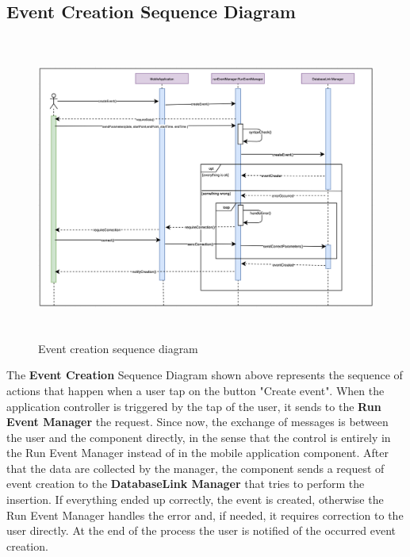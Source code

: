 \documentclass[DD.tex]{subfiles}
\begin{document}
\subsection{Event Creation Sequence Diagram}
\begin{figure}[h!]
\centering
\includegraphics[height=10.00cm,keepaspectratio]{Figures/EventCreation}
\caption{Event creation sequence diagram}
\end{figure}

The \textbf{Event Creation} Sequence Diagram shown above represents the sequence of actions that happen when a user tap on the button "Create event".
When the application controller is triggered by the tap of the user, it sends to the \textbf{Run Event Manager} the request.
Since now, the exchange of messages is between the user and the component directly, in the sense that the control is entirely in the Run Event Manager instead of in the mobile application component.
After that the data are collected by the manager, the component sends a request of event creation to the \textbf{DatabaseLink Manager} that tries to perform the insertion. \newline
If everything ended up correctly, the event is created, otherwise the Run Event Manager handles the error and, if needed, it requires correction to the user directly.
At the end of the process the user is notified of the occurred event creation.
\newpage
\end{document}

